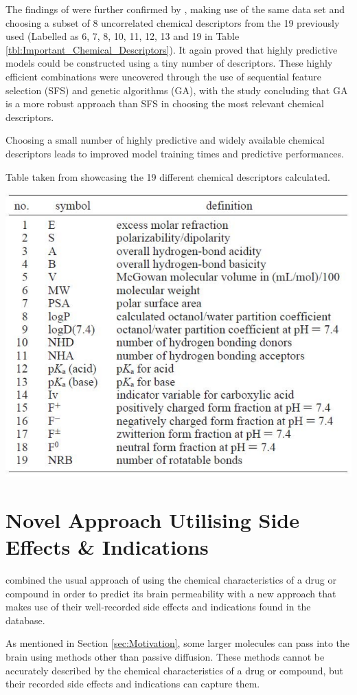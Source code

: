 The findings of \citet{Zhao2007} were further confirmed by \citet{Saber2020}, making use of the same data set and choosing a subset of 8 uncorrelated chemical descriptors from the 19 previously used (Labelled as 6, 7, 8, 10, 11, 12, 13 and 19 in Table \ref{tbl:Important_Chemical_Descriptors}). It again proved that highly predictive models could be constructed using a tiny number of descriptors. These highly efficient combinations were uncovered through the use of sequential feature selection (SFS) and genetic algorithms (GA), with the study concluding that GA is a more robust approach than SFS in choosing the most relevant chemical descriptors.

Choosing a small number of highly predictive and widely available chemical descriptors leads to improved model training times and predictive performances.

\begin{table}[!ht]
  \caption{Table taken from \citet{Zhao2007} showcasing the 19 different chemical descriptors calculated.}
  \label{tbl:Important_Chemical_Descriptors}
  \includegraphics[width=0.55\linewidth]{images/Zhao_Table1.pdf}
\end{table}

\newpage

\section{Novel Approach Utilising Side Effects \& Indications}
\label{sec:Novel_Approach}

\citet{Gao2017} combined the usual approach of using the chemical characteristics of a drug or compound in order to predict its brain permeability with a new approach that makes use of their well-recorded side effects and indications found in the \citet{SIDER} database. 

As mentioned in Section \ref{sec:Motivation}, some larger molecules can pass into the brain using methods other than passive diffusion. These methods cannot be accurately described by the chemical characteristics of a drug or compound, but their recorded side effects and indications can capture them.

